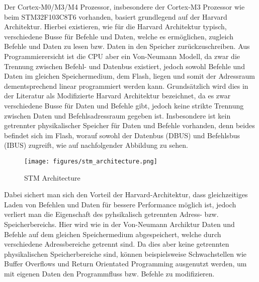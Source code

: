 \documentclass[a4paper,
DIV=13,
12pt,
BCOR=10mm,
department=FakIM,
oneside,
parskip=half,
automark,
listof=totocnumbered,
bibliography=totocnumbered,
acronym=totocnumbered
] {OTHRartcl}
\begin{document}
Der Cortex-M0/M3/M4 Prozessor, insbesondere der Cortex-M3 Prozessor wie beim STM32F103C8T6 vorhanden, basiert grundlegend auf der Harvard Architektur.
Hierbei existieren, wie für die Harvard Architektur typisch, verschiedene Busse für Befehle und Daten, welche es ermöglichen, zugleich Befehle und Daten zu lesen bzw. Daten in den Speicher zurückzuschreiben.
Aus Programmierersicht ist die CPU aber ein Von-Neumann Modell, da zwar die Trennung zwischen Befehl- und Datenbus existiert, jedoch sowohl Befehle und Daten im gleichen Speichermedium, dem Flash, liegen und
somit der Adressraum dementsprechend linear programmiert werden kann.
Grundsätzlich wird dies in der Literatur als Modifizierte Harvard Architektur bezeichnet, da es zwar verschiedene Busse für Daten und Befehle gibt, jedoch keine strikte Trennung zwischen Daten und Befehlsadressraum gegeben ist.
Insbesondere ist kein getrennter physikalischer Speicher für Daten und Befehle vorhanden, denn beides befindet sich im Flash, worauf sowohl der Datenbus (DBUS) und Befehlsbus (IBUS) zugreift, wie auf
nachfolgender Abbildung zu sehen.
\begin{figure}[ht!]
  \begin{center}
    \texttt{[image: figures/stm\_architecture.png]}
    \caption{STM Architecture}
    \label{fig: STM Architektur}
  \end{center}
\end{figure}
Dabei sichert man sich den Vorteil der Harvard-Architektur, dass gleichzeitiges Laden von Befehlen und Daten für bessere Performance möglich ist, jedoch
verliert man die Eigenschaft des pyhsikalisch getrennten Adress- bzw. Speicherbereichs. Hier wird wie in der Von-Neumann Archiktur Daten und Befehle auf dem gleichen Speichermedium abgespeichert, welche durch verschiedene Adressbereiche getrennt sind. Da dies aber keine getrennten physikalischen Speicherbereiche sind, können beispielsweise Schwachstellen wie Buffer Overflows und Return Orientated Programming ausgenutzt werden, um mit eigenen Daten den Programmfluss bzw. Befehle zu modifizieren.
\cite{ARM Modell Overview} \cite{STM32 Mikro Prozessorarchitekturen} \cite{STM32 Mikro STM32} \cite{STM32 Controller Lecture}
\end{document}
